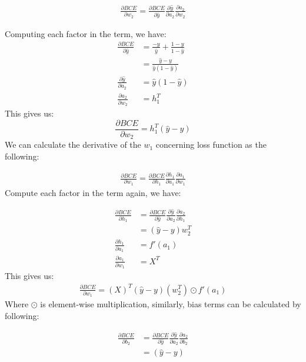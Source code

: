 \documentclass[a4paper, nobind]{templates/ociamthesis}
\begin{document}
\[
\begin{aligned} 
\frac{\partial BCE}{\partial w_{2}}=\frac{\partial BCE}{\partial \hat{y}} \frac{\partial \hat{y}}{\partial a_{2}} \frac{\partial a_{2}}{\partial w_{2}}
\end{aligned}
\]

Computing each factor in the term, we have:
\[
\begin{aligned}
\frac{\partial BCE}{\partial \hat{y}} &=\frac{-y}{\hat{y}}+\frac{1-y}{1-\hat{y}} \\
&=\frac{\hat{y}-y}{\hat{y}\left(1-\hat{y}\right)} \\
\frac{\partial \hat{y}}{\partial a_{2}} &=\hat{y}\left(1-\hat{y}\right) \\
\frac{\partial a_{2}}{\partial w_{2}} &=h_{1}^T
\end{aligned}
\]
This gives us:
\[
\frac{\partial BCE}{\partial w_{2}}=h_{1}^T\left(\hat{y}-y\right)
\]
We can calculate the derivative of the \(w_1\) concerning loss function as the following:

\[
\begin{aligned} 
\frac{\partial BCE}{\partial w_{1}}=\frac{\partial BCE}{\partial h_1} \frac{\partial h_1}{\partial a_{1}} \frac{\partial a_{1}}{\partial w_{1}}
\end{aligned}
\]
Compute each factor in the term again, we have:

\[
\begin{aligned}
\frac{\partial BCE}{\partial h_1} &= \frac{\partial BCE}{\partial \hat{y}} \frac{\partial \hat{y}}{\partial a_{2}} \frac{\partial a_{2}}{\partial h_{1}}  \\
&= \left(\hat{y}-y\right) w_{2}^T \\
\frac{\partial h_1}{\partial a_{1}} &=f'(a_1) \\
\frac{\partial a_{1}}{\partial w_{1}} &=X^T
\end{aligned}
\]
This gives us:
\[
\begin{aligned}
\frac{\partial BCE}{\partial w_{1}}= \left(X\right)^T\left(\hat{y}-y\right)\left(w_{2}^T\right) \odot f'(a_1)
\end{aligned}
\]
Where \(\odot\) is element-wise multiplication, similarly, bias terms can be calculated by following:

\[
\begin{aligned} 
\frac{\partial BCE}{\partial b_{2}}&=\frac{\partial BCE}{\partial \hat{y}} \frac{\partial \hat{y}}{\partial a_{2}} \frac{\partial a_{2}}{\partial b_{2}} \\
&= \left(\hat{y}-y\right)
\end{aligned}
\]
\end{document}
